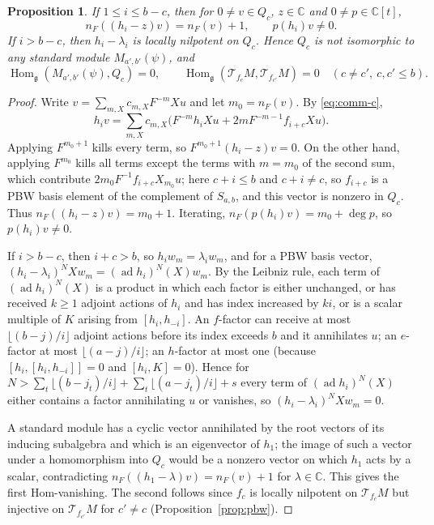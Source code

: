 \documentclass[11pt,a4paper]{article}
\newcommand{\C}{\mathbb C}
\newcommand{\g}{\mathfrak g}
\newcommand{\ad}{\operatorname{ad}}
\newcommand{\Hom}{\operatorname{Hom}}
\newcommand{\T}{\mathcal T}
\newtheorem{proposition}[theorem]{Proposition}
\begin{document}
\begin{proposition}\label{prop:cartan}
If $1\le i\le b-c$, then for $0\ne v\in Q_c$, $z\in\C$ and
$0\ne p\in\C[t]$,
\[
 n_F((h_i-z)v)=n_F(v)+1,\qquad p(h_i)v\ne0.
\]
If $i>b-c$, then $h_i-\lambda_i$ is locally nilpotent on $Q_c$. Hence
$Q_c$ is not isomorphic to any standard module $M_{a',b'}(\psi)$, and
\[
 \Hom_\g(M_{a',b'}(\psi),Q_c)=0,\qquad
 \Hom_\g(\T_{f_c}M,\T_{f_{c'}}M)=0\quad(c\ne c',\ c,c'\le b).
\]
\end{proposition}
\begin{proof}
Write $v=\sum_{m,X}c_{m,X}F^{-m}Xu$ and let $m_0=n_F(v)$. By
\eqref{eq:comm-c},
\[
 h_iv=\sum_{m,X}c_{m,X}\bigl(F^{-m}h_iXu+2mF^{-m-1}f_{i+c}Xu\bigr).
\]
Applying $F^{m_0+1}$ kills every term, so $F^{m_0+1}(h_i-z)v=0$. On the
other hand, applying $F^{m_0}$ kills all terms except the terms with
$m=m_0$ of the second sum, which contribute
$2m_0F^{-1}f_{i+c}X_{m_0}u$; here $c+i\le b$ and $c+i\ne c$, so $f_{i+c}$
is a PBW basis element of the complement of $S_{a,b}$, and this vector is
nonzero in $Q_c$. Thus $n_F((h_i-z)v)=m_0+1$. Iterating,
$n_F(p(h_i)v)=m_0+\deg p$, so $p(h_i)v\ne0$.

If $i>b-c$, then $i+c>b$, so $h_iw_m=\lambda_iw_m$, and for a PBW basis
vector, $(h_i-\lambda_i)^NXw_m=(\ad h_i)^N(X)w_m$. By the Leibniz rule,
each term of $(\ad h_i)^N(X)$ is a product in which each factor is either
unchanged, or has received $k\ge1$ adjoint actions of $h_i$ and has index
increased by $ki$, or is a scalar multiple of $K$ arising from
$[h_i,h_{-i}]$. An $f$-factor can receive at most $\lfloor(b-j)/i\rfloor$
adjoint actions before its index exceeds $b$ and it annihilates $u$; an
$e$-factor at most $\lfloor(a-j)/i\rfloor$; an $h$-factor at most one
(because $[h_i,[h_i,h_{-i}]]=0$ and $[h_i,K]=0$). Hence for
$N>\sum_{t}\lfloor(b-j_t)/i\rfloor+\sum_{t}\lfloor(a-j_t)/i\rfloor+s$
every term of $(\ad h_i)^N(X)$ either contains a factor annihilating $u$
or vanishes, so $(h_i-\lambda_i)^NXw_m=0$.

A standard module has a cyclic vector annihilated by the root vectors of
its inducing subalgebra and which is an eigenvector of $h_1$; the image of
such a vector under a homomorphism into $Q_c$ would be a nonzero vector on
which $h_1$ acts by a scalar, contradicting $n_F((h_1-\lambda)v)=n_F(v)+1$
for $\lambda\in\C$. This gives the first Hom-vanishing. The second
follows since $f_c$ is locally nilpotent on $\T_{f_c}M$ but injective on
$\T_{f_{c'}}M$ for $c'\ne c$ (Proposition~\ref{prop:pbw}).
\end{proof}
\end{document}
